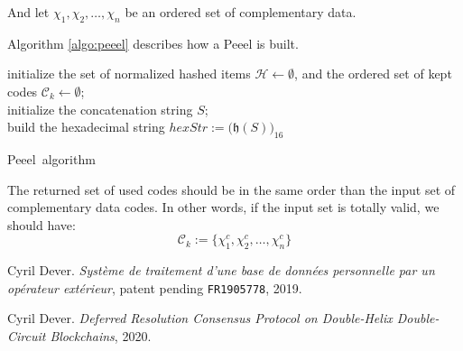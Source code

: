 \documentclass[twoside,twocolumn]{article}
\theoremstyle{definition}
\theoremstyle{remark}
\begin{document}
And let $\chi_1, \chi_2, \dots, \chi_n$ be an ordered set of complementary data.

Algorithm \ref{algo:peeel} describes how a Peeel is built.
\begin{algorithm}
    initialize the set of normalized hashed items $\mathcal{H} \gets \emptyset$,
        and the ordered set of kept codes $\mathcal{C}_{k} \gets \emptyset$; \\
    initialize the concatenation string $S$; \\
    build the hexadecimal string $hexStr := \Big( \mathfrak{h}(S) \Big)_{16}$ \\
    \caption{Peeel\texttrademark~algorithm}
    \label{algo:peeel}
\end{algorithm}

The returned set of used codes should be in the same order than the input set of complementary data codes.
In other words, if the input set is totally valid, we should have:$$
    \mathcal{C}_{k} := \{ \chi_1^c, \chi_2^c, \dots, \chi_n^c \}
$$




\begin{thebibliography}{99} %

Cyril Dever. \emph{Système de traitement d'une base de données personnelle par un opérateur extérieur}, patent pending \texttt{FR1905778}, 2019.

Cyril Dever. \emph{Deferred Resolution Consensus Protocol on Double-Helix Double-Circuit Blockchains}, 2020.

\end{thebibliography}

\end{document}
